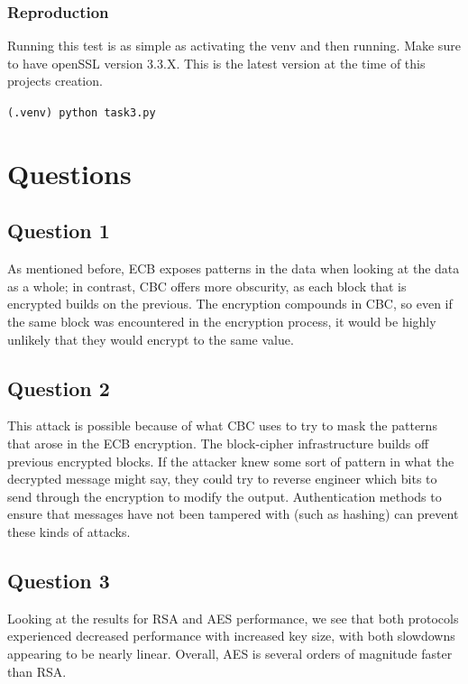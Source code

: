 \documentclass[11pt]{article}
\begin{document}
\subsubsection*{Reproduction}

Running this test is as simple as activating the venv and then running. Make sure to have openSSL version 3.3.X. This is the latest version at the time of this projects creation. 

\verb|(.venv) python task3.py|

\section*{Questions}
\subsection*{Question 1}

As mentioned before, ECB exposes patterns in the data when looking at the data as a whole; in contrast, CBC offers more obscurity, as each block that is encrypted builds on the previous. The encryption compounds in CBC, so even if the same block was encountered in the encryption process, it would be highly unlikely that they would encrypt to the same value. 

\subsection*{Question 2}

This attack is possible because of what CBC uses to try to mask the patterns that arose in the ECB encryption. The block-cipher infrastructure builds off previous encrypted blocks. If the attacker knew some sort of pattern in what the decrypted message might say, they could try to reverse engineer which bits to send through the encryption to modify the output. Authentication methods to ensure that messages have not been tampered with (such as hashing) can prevent these kinds of attacks.

\subsection*{Question 3}

Looking at the results for RSA and AES performance, we see that both protocols experienced decreased performance with increased key size, with both slowdowns appearing to be nearly linear. Overall, AES is several orders of magnitude faster than RSA.
\end{document}
